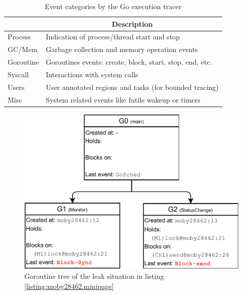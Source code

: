 \begin{table}[]
    \centering
        \caption{Event categories by the Go execution tracer}
        \begin{tabular}{|l|l|}
        \hline
        \rowcolor[HTML]{C0C0C0}
        \multicolumn{1}{|c|}{\cellcolor[HTML]{C0C0C0}\textbf{Category}} & \multicolumn{1}{c|}{\cellcolor[HTML]{C0C0C0}\textbf{Description}} \\ \hline
        Process & Indication of process/thread start and stop \\ \hline
        GC/Mem & Garbage collection and memory operation events\\ \hline
        Goroutine & Goroutines events: create, block, start, stop, end, etc. \\ \hline
        Syscall & Interactions with system calls \\ \hline
        Users & User annotated regions and tasks (for bounded tracing) \\ \hline
        Misc & System related events like futile wakeup or timers \\ \hline
        \end{tabular}
    \label{tab:events}
\end{table}



\begin{figure}[]
\centering
\includegraphics[width=0.75\linewidth]{goat/figs/gtree.pdf}
\caption{Goroutine tree of the leak situation in listing \ref{listing:moby28462.minipage}}
\label{fig:gtree}
\end{figure}



